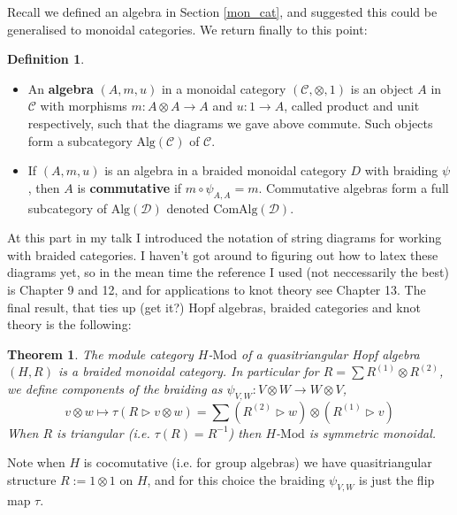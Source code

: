 \documentclass[11pt]{article}
\newcommand{\bb}{\medbreak}
\newcommand{\nt}{\noindent}
\newcommand{\rt}{\xrightarrow{}}
\newcommand{\Mod}{\text{Mod}}
\newcommand{\define}[1]{\textbf{#1}}
\newtheorem{theorem}[lemma]{Theorem}
\theoremstyle{definition}
\newtheorem{definition}[lemma]{Definition}
\begin{document}
\nt Recall we defined an algebra in Section \ref{mon_cat}, and suggested this could be generalised to monoidal categories. We return finally to this point:
\begin{definition}\label{algebra} \begin{itemize}
  \item An \define{algebra} $(A,m,u)$ in a monoidal category $(\mathcal{C},\otimes,1)$ is an object $A$ in $\mathcal{C}$ with morphisms $m:A\otimes A\rt A$ and $u:1\rt A$, called product and unit respectively, such that the diagrams we gave above commute. Such objects form a subcategory $\text{Alg}(\mathcal{C})$ of $\mathcal{C}$.

  \item If $(A,m,u)$ is an algebra in a braided monoidal category $D$ with braiding $\psi$, then $A$ is \define{commutative} if $m\circ \psi_{A,A}=m$. Commutative algebras form a full subcategory of $\text{Alg}(\mathcal{D})$ denoted $\text{ComAlg}(\mathcal{D})$.
\end{itemize}
\end{definition}

\nt At this part in my talk I introduced the notation of string diagrams for working with braided categories. I haven't got around to figuring out how to latex these diagrams yet, so in the mean time the reference I used (not neccessarily the best) is \cite{alma9916633704401631} Chapter 9 and 12, and for applications to knot theory see Chapter 13. The final result, that ties up (get it?) Hopf algebras, braided categories and knot theory is the following:

\begin{theorem}\label{hopf_braiding} The module category $H$-$\Mod$ of a quasitriangular Hopf algebra $(H,R)$ is a braided monoidal category. In particular for $R=\sum R^{(1)}\otimes R^{(2)}$, we define components of the braiding as $\psi_{V,W}:V\otimes W \rt W\otimes V$,
$$v\otimes w \mapsto \tau(R\rhd v\otimes w)=\sum (R^{(2)}\rhd w)\otimes (R^{(1)}\rhd v)$$  
When $R$ is triangular (i.e. $\tau(R)=R^{-1}$) then $H$-$\Mod$ is symmetric monoidal.\end{theorem} 
\nt Note when $H$ is cocomutative (i.e. for group algebras) we have quasitriangular structure $R:=1\otimes 1$ on $H$, and for this choice the braiding $\psi_{V,W}$ is just the flip map $\tau$.\bb











\newpage


 
\end{document}
